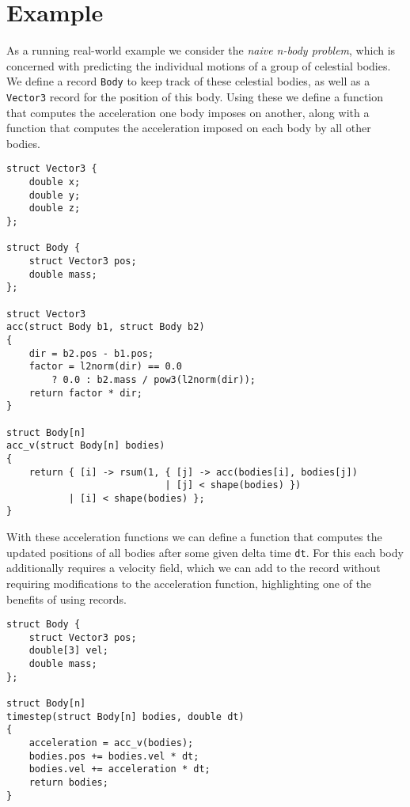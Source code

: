 
\section{Example}\label{sec:example}

As a running real-world example we consider the \textit{naive n-body problem}, which is concerned with predicting the individual motions of a group of celestial bodies.
We define a record \texttt{Body} to keep track of these celestial bodies, as well as a \texttt{Vector3} record for the position of this body.
Using these we define a function that computes the acceleration one body imposes on another, along with a function that computes the acceleration imposed on each body by all other bodies.
%
\begin{lstlisting}
struct Vector3 {
    double x;
    double y;
    double z;
};

struct Body {
    struct Vector3 pos;
    double mass;
};

struct Vector3
acc(struct Body b1, struct Body b2)
{
    dir = b2.pos - b1.pos;
    factor = l2norm(dir) == 0.0
        ? 0.0 : b2.mass / pow3(l2norm(dir));
    return factor * dir;
}

struct Body[n]
acc_v(struct Body[n] bodies)
{
    return { [i] -> rsum(1, { [j] -> acc(bodies[i], bodies[j])
                            | [j] < shape(bodies) })
           | [i] < shape(bodies) };
}
\end{lstlisting}
%
With these acceleration functions we can define a function that computes the updated positions of all bodies after some given delta time \texttt{dt}.
For this each body additionally requires a velocity field, which we can add to the record without requiring modifications to the acceleration function, highlighting one of the benefits of using records.
%
\begin{lstlisting}
struct Body {
    struct Vector3 pos;
    double[3] vel;
    double mass;
};

struct Body[n]
timestep(struct Body[n] bodies, double dt)
{
    acceleration = acc_v(bodies);
    bodies.pos += bodies.vel * dt;
    bodies.vel += acceleration * dt;
    return bodies;
}
\end{lstlisting}
